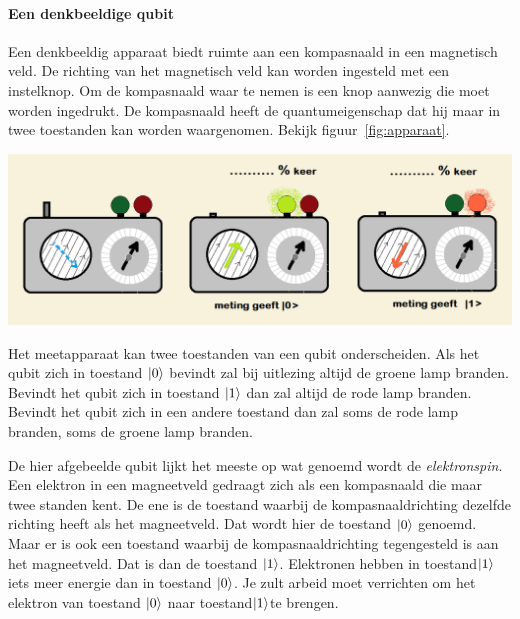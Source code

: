 \documentclass[../main.tex]{subfiles}
\begin{document}
\paragraph{Een denkbeeldige qubit}
Een denkbeeldig apparaat biedt ruimte aan een kompasnaald in een magnetisch veld. De richting van het  magnetisch veld  kan worden ingesteld met een instelknop.  Om de kompasnaald waar te nemen is een knop aanwezig die moet worden ingedrukt. De kompasnaald heeft de quantumeigenschap dat hij maar in twee toestanden kan worden waargenomen. Bekijk figuur~\ref{fig:apparaat}.


\begin{center}
\leavevmode
\includegraphics[width=\textwidth]{./img/apparaat.png}
\end{center}


Het meetapparaat kan twee toestanden van een qubit onderscheiden. Als het qubit zich in toestand $\ket{0}$ bevindt zal bij uitlezing altijd de groene lamp branden. Bevindt het qubit zich in toestand $\ket{1}$ dan zal altijd de rode lamp branden. Bevindt het qubit zich in een andere toestand dan zal soms de rode lamp branden, soms de groene lamp branden.

De hier afgebeelde qubit lijkt het meeste op wat genoemd wordt de \textit{elektronspin}. Een elektron in een magneetveld gedraagt zich als een kompasnaald die maar twee standen kent. De ene is de toestand waarbij de kompasnaaldrichting dezelfde richting heeft als het magneetveld. Dat wordt hier de toestand $\ket{0}$ genoemd. Maar er is ook een toestand waarbij de kompasnaaldrichting tegengesteld is aan het magneetveld. Dat is dan de toestand $\ket{1}$. Elektronen hebben in toestand$\ket{1}$ iets meer energie dan in toestand $\ket{0}$. Je zult arbeid moet verrichten om het elektron van toestand $\ket{0}$ naar toestand$\ket{1}$te brengen. 
\end{document}
